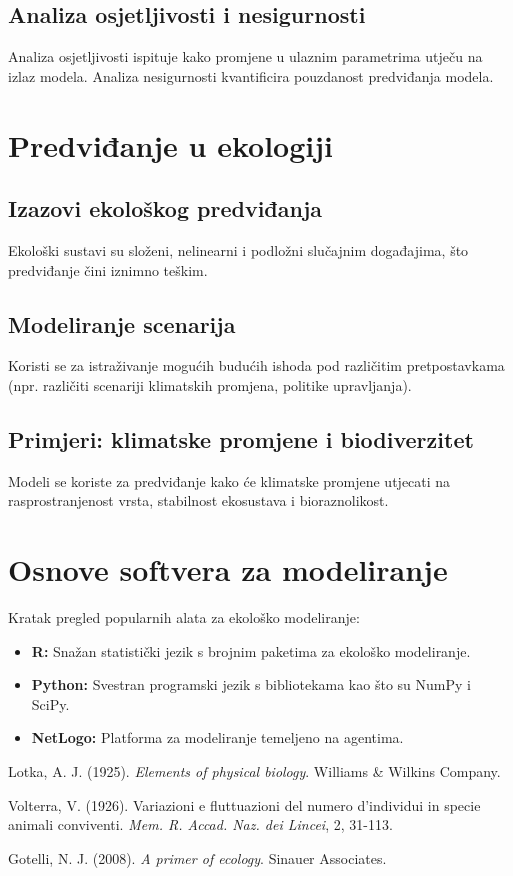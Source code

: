 \documentclass[12pt, a4paper]{book}
\begin{document}
	\section{Analiza osjetljivosti i nesigurnosti}
	Analiza osjetljivosti ispituje kako promjene u ulaznim parametrima utječu na izlaz modela. Analiza nesigurnosti kvantificira pouzdanost predviđanja modela.
	
	\chapter{Predviđanje u ekologiji}
	\section{Izazovi ekološkog predviđanja}
	Ekološki sustavi su složeni, nelinearni i podložni slučajnim događajima, što predviđanje čini iznimno teškim.
	
	\section{Modeliranje scenarija}
	Koristi se za istraživanje mogućih budućih ishoda pod različitim pretpostavkama (npr. različiti scenariji klimatskih promjena, politike upravljanja).
	
	\section{Primjeri: klimatske promjene i biodiverzitet}
	Modeli se koriste za predviđanje kako će klimatske promjene utjecati na rasprostranjenost vrsta, stabilnost ekosustava i bioraznolikost.
	
	\appendix
	\chapter{Osnove softvera za modeliranje}
	Kratak pregled popularnih alata za ekološko modeliranje:
	\begin{itemize}
		\item \textbf{R:} Snažan statistički jezik s brojnim paketima za ekološko modeliranje.
		\item \textbf{Python:} Svestran programski jezik s bibliotekama kao što su NumPy i SciPy.
		\item \textbf{NetLogo:} Platforma za modeliranje temeljeno na agentima.
	\end{itemize}
	
	\backmatter
	\begin{thebibliography}{9}
		Lotka, A. J. (1925). \textit{Elements of physical biology}. Williams \& Wilkins Company.
		
		Volterra, V. (1926). Variazioni e fluttuazioni del numero d'individui in specie animali conviventi. \textit{Mem. R. Accad. Naz. dei Lincei}, 2, 31-113.
		
		Gotelli, N. J. (2008). \textit{A primer of ecology}. Sinauer Associates.
		
	\end{thebibliography}
	
\end{document}
